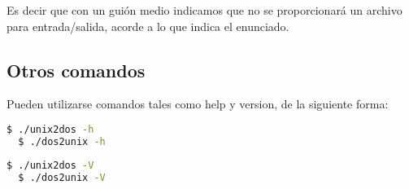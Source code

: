 \documentclass[a4paper]{article}
\begin{document}
Es decir que con un guión medio indicamos que no se proporcionará un archivo para entrada/salida, acorde a lo que indica el enunciado.

\subsection{Otros comandos}

Pueden utilizarse comandos tales como help y version, de la siguiente forma:

\begin{lstlisting}[language=bash]
  $ ./unix2dos -h
  $ ./dos2unix -h
\end{lstlisting}

\begin{lstlisting}[language=bash]
  $ ./unix2dos -V
  $ ./dos2unix -V
\end{lstlisting}
\end{document}
